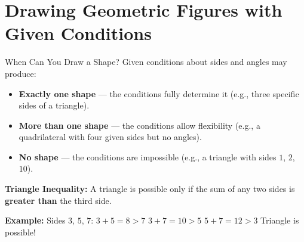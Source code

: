 \section{Drawing Geometric Figures with Given Conditions}

\begin{quickReview}{When Can You Draw a Shape?}
Given conditions about sides and angles may produce:

\begin{itemize}[leftmargin=*]
    \item \textbf{Exactly one shape} — the conditions fully determine it (e.g., three specific sides of a triangle).
    \item \textbf{More than one shape} — the conditions allow flexibility (e.g., a quadrilateral with four given sides but no angles).
    \item \textbf{No shape} — the conditions are impossible (e.g., a triangle with sides $1$, $2$, $10$).
\end{itemize}

\medskip
\textbf{Triangle Inequality:} A triangle is possible only if the sum of any two sides is \textbf{greater than} the third side.

\smallskip
\textbf{Example:} Sides $3$, $5$, $7$: \quad $3 + 5 = 8 > 7$ \checkmark \quad $3 + 7 = 10 > 5$ \checkmark \quad $5 + 7 = 12 > 3$ \checkmark \quad Triangle is possible!
\end{quickReview}

